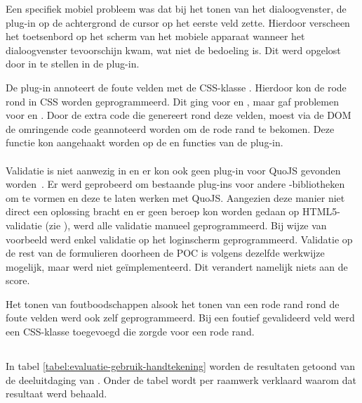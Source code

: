 Een specifiek mobiel probleem was dat bij het tonen van het dialoogvenster, de plug-in op de achtergrond de cursor op het eerste veld zette. 
Hierdoor verscheen het toetsenbord op het scherm van het mobiele apparaat wanneer het dialoogvenster tevoorschijn kwam, wat niet de bedoeling is. 
Dit werd opgelost door  in te stellen in de plug-in.

De plug-in annoteert de foute velden met de CSS-klasse .
Hierdoor kon de rode rond in CSS worden geprogrammeerd. 
Dit ging voor  en , maar gaf problemen voor  en .
Door de extra code die \jqm{} genereert rond deze velden, moest via de DOM de omringende code geannoteerd worden om de rode rand te bekomen. 
Deze functie kon aangehaakt worden op de  en  functies van de plug-in.

\paragraph{\lungo}
Validatie is niet aanwezig in \lungo{} en er kon ook geen plug-in voor QuoJS gevonden worden~\cite{Ameye2013}.
Er werd geprobeerd om bestaande plug-ins voor andere \js{}-bibliotheken om te vormen en deze te laten werken met QuoJS.
Aangezien deze manier niet direct een oplossing bracht en er geen beroep kon worden gedaan op HTML5-validatie (zie \jqm{}), werd alle validatie manueel geprogrammeerd. 
Bij wijze van voorbeeld werd enkel validatie op het loginscherm geprogrammeerd.
Validatie op de rest van de formulieren doorheen de POC is volgens dezelfde werkwijze mogelijk, maar werd niet geïmplementeerd.
Dit verandert namelijk niets aan de score.

Het tonen van foutboodschappen alsook het tonen van een rode rand rond de foute velden werd ook zelf geprogrammeerd.
Bij een foutief gevalideerd veld werd een CSS-klasse toegevoegd die zorgde voor een rode rand.


\subsection{}
\label{sec:evaluatie-gebruik-handtekening}

In tabel \ref{tabel:evaluatie-gebruik-handtekening} worden de resultaten getoond van de deeluitdaging van .
Onder de tabel wordt per raamwerk verklaard waarom dat resultaat werd behaald.

